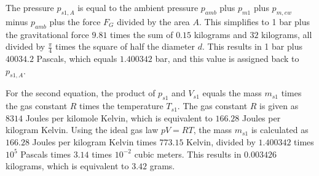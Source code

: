 The pressure \( p_{s1, A} \) is equal to the ambient pressure \( p_{amb} \) plus \( p_{m1} \) plus \( p_{m, ew} \) minus \( p_{amb} \) plus the force \( F_G \) divided by the area \( A \). This simplifies to 1 bar plus the gravitational force \( 9.81 \) times the sum of \( 0.15 \) kilograms and \( 32 \) kilograms, all divided by \( \frac{\pi}{4} \) times the square of half the diameter \( d \). This results in 1 bar plus \( 40034.2 \) Pascals, which equals \( 1.400342 \) bar, and this value is assigned back to \( p_{s1, A} \).

For the second equation, the product of \( p_{s1} \) and \( V_{s1} \) equals the mass \( m_{s1} \) times the gas constant \( R \) times the temperature \( T_{s1} \). The gas constant \( R \) is given as \( 8314 \) Joules per kilomole Kelvin, which is equivalent to \( 166.28 \) Joules per kilogram Kelvin. Using the ideal gas law \( pV = RT \), the mass \( m_{s1} \) is calculated as \( 166.28 \) Joules per kilogram Kelvin times \( 773.15 \) Kelvin, divided by \( 1.400342 \) times \( 10^5 \) Pascals times \( 3.14 \) times \( 10^{-2} \) cubic meters. This results in \( 0.003426 \) kilograms, which is equivalent to \( 3.42 \) grams.